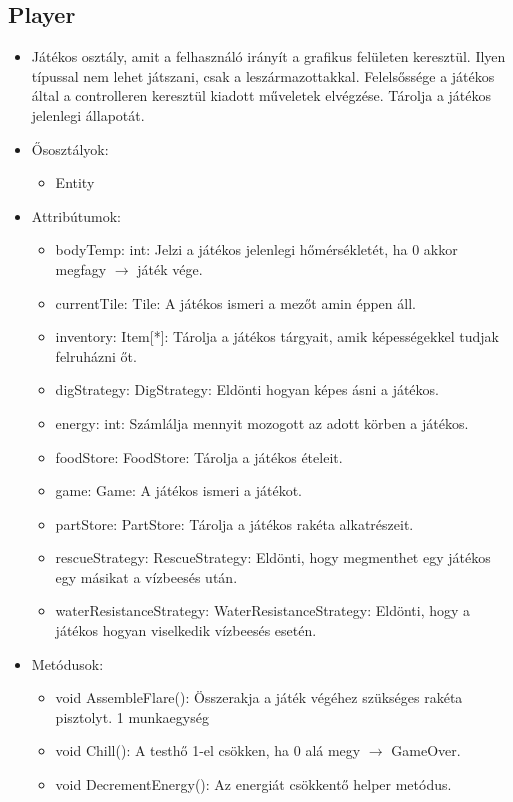 \subsection{Player}
\begin{itemize}
	\item Játékos osztály, amit a felhasználó irányít a grafikus felületen keresztül. Ilyen típussal nem lehet játszani, csak a leszármazottakkal. Felelsőssége a játékos által a controlleren keresztül kiadott műveletek elvégzése. Tárolja a játékos jelenlegi állapotát.
	\item Ősosztályok:
	\begin{itemize}
		\item Entity
	\end{itemize}
	\item Attribútumok:
	\begin{itemize}
		\item bodyTemp: int: Jelzi a játékos jelenlegi hőmérsékletét, ha 0 akkor megfagy $\rightarrow$ játék vége.
		\item currentTile: Tile: A játékos ismeri a mezőt amin éppen áll.
		\item inventory: Item[*]: Tárolja a játékos tárgyait, amik képességekkel tudjak felruházni őt.
		\item digStrategy: DigStrategy: Eldönti hogyan képes ásni a játékos.
		\item energy: int: Számlálja mennyit mozogott az adott körben a játékos.
		\item foodStore: FoodStore: Tárolja a játékos ételeit.
		\item game: Game: A játékos ismeri a játékot.
		\item partStore: PartStore: Tárolja a játékos rakéta alkatrészeit.
		\item rescueStrategy: RescueStrategy: Eldönti, hogy megmenthet egy játékos egy másikat a vízbeesés után.
		\item waterResistanceStrategy: WaterResistanceStrategy: Eldönti, hogy a játékos hogyan viselkedik vízbeesés esetén.
	\end{itemize}
	\item Metódusok:
	\begin{itemize}
		\item void AssembleFlare(): Összerakja a játék végéhez szükséges rakéta pisztolyt. 1 munkaegység
		\item void Chill(): A testhő 1-el csökken, ha 0 alá megy $\rightarrow$ GameOver.
		\item void DecrementEnergy(): Az energiát csökkentő helper metódus.

\end{itemize}
\end{itemize}
